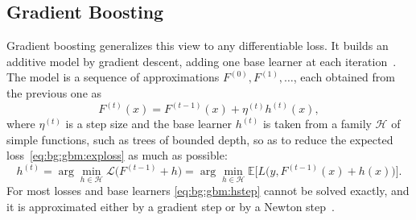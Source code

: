 \subsection{Gradient Boosting}
    \label{subsec:bg:gbm:gradient}
    Gradient boosting generalizes this view to any differentiable loss. It
    builds an additive model by gradient descent, adding one base learner at each
    iteration~\cite{friedman2001}. The model is a sequence of approximations
    $F^{(0)}, F^{(1)}, \dots$, each obtained from the previous one as
    \begin{equation}
    F^{(t)}(x) = F^{(t-1)}(x) + \eta^{(t)} h^{(t)}(x),
    \label{eq:bg:gbm:stagewise}
    \end{equation}
    where $\eta^{(t)}$ is a step size and the base learner $h^{(t)}$ is taken from
    a family $\mathcal{H}$ of simple functions, such as trees of bounded depth, so
    as to reduce the expected loss~\eqref{eq:bg:gbm:exploss} as much as possible:
    \begin{equation}
    h^{(t)}
    = \arg\min_{h \in \mathcal{H}} \mathcal{L}\bigl(F^{(t-1)} + h\bigr)
    = \arg\min_{h \in \mathcal{H}}
      \mathbb{E}\bigl[ L\bigl(y, F^{(t-1)}(x) + h(x)\bigr) \bigr].
    \label{eq:bg:gbm:hstep}
    \end{equation}
    For most losses and base learners \eqref{eq:bg:gbm:hstep} cannot be solved
    exactly, and it is approximated either by a gradient step or by a Newton
    step~\cite{prokhorenkova2018}.
    
